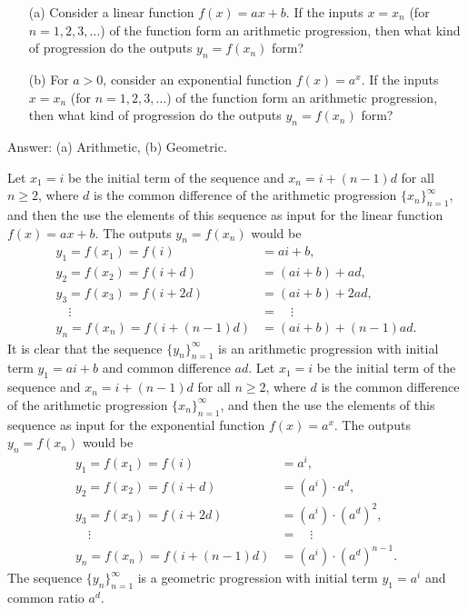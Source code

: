\documentclass[12pt,a4paper]{memoir}
\theoremstyle{definition}
\begin{document}
	
\setcounter{question}{102}
	\begin{tcolorbox}
		\begin{question}
			\begin{itemize}
				\item[(a)] Consider a linear function $f(x)=ax+b$. If the inputs $x=x_n$ (for $n=1,2,3,\dots$) of the function form an arithmetic progression, then what kind of progression do the outputs $y_n=f(x_n)$ form?
				\item[(b)] For $a>0$, consider an exponential function $f(x)=a^x$. If the inputs $x=x_n$ (for $n=1,2,3,\dots$) of the function form an arithmetic progression, then what kind of progression do the outputs $y_n=f(x_n)$ form?
			\end{itemize}
		\end{question}
	\end{tcolorbox}
	
	\begin{solution}
		Answer: (a) Arithmetic, (b) Geometric.
		\begin{tasks}
			\task Let $x_1=i$ be the initial term of the sequence and $x_n=i+(n-1)d$ for all $n \geq 2$, where $d$ is the common difference of the arithmetic progression $\{x_n\}_{n=1}^{\infty}$, and then the use the elements of this sequence as input for the linear function $f(x)=ax+b$. The outputs $y_n=f(x_n)$ would be
			\begin{align*}
				y_1 = f(x_1)=f(i) &= ai+b,\\
				y_2 = f(x_2)=f(i+d) &= (ai+b)+ad,\\
				y_3 = f(x_3)=f(i+2d) &= (ai+b)+2ad,\\
				\quad \vdots \quad &= \quad \vdots \\
				y_n = f(x_n) = f(i+(n-1)d) &= (ai+b)+ (n-1)ad.
			\end{align*}
			It is clear that the sequence  $\{y_n\}_{n=1}^{\infty}$ is an arithmetic progression with initial term $y_1=ai+b$ and common difference $ad$.
			\task Let $x_1=i$ be the initial term of the sequence and $x_n=i+(n-1)d$ for all $n \geq 2$, where $d$ is the common difference of the arithmetic progression $\{x_n\}_{n=1}^{\infty}$, and then the use the elements of this sequence as input for the exponential function $f(x)=a^x$. The outputs $y_n=f(x_n)$ would be
			\begin{align*}
				y_1 = f(x_1)=f(i) &= a^i,\\
				y_2 = f(x_2)=f(i+d) &= (a^i) \cdot a^d,\\
				y_3 = f(x_3)=f(i+2d) &= (a^i) \cdot (a^d)^2,\\
				\quad \vdots \quad &= \quad \vdots \\
				y_n = f(x_n) = f(i+(n-1)d) &= (a^i) \cdot (a^d)^{n-1}.
			\end{align*}
			The sequence  $\{y_n\}_{n=1}^{\infty}$ is a geometric progression with initial term $y_1=a^i$ and common ratio $a^d$.
		\end{tasks}
	\end{solution}
	
\end{document}
